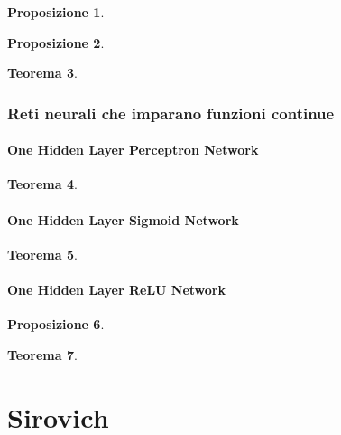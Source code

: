 \documentclass[10pt]{book}
\newcommand{\1}{\mathds{1}}
\theoremstyle{definition}%
\newtheorem{thm}{Teorema}[section]
\newtheorem{prop}[thm]{Proposizione}
\theoremstyle{plain}
\theoremstyle{remark}
\begin{document}
\begin{prop}
\lipsum[1]
\end{prop}
\begin{prop}
\lipsum[2]
\end{prop}
\begin{thm}
\lipsum[4]
\end{thm}
\section{Reti neurali che imparano funzioni continue}
\label{sec:orgf5c5714}

\subsection{One Hidden Layer Perceptron Network}
\label{sec:org2c7be58}

\begin{thm}
\lipsum[5]
\end{thm}
\subsection{One Hidden Layer Sigmoid Network}
\label{sec:org2e10325}

\begin{thm}
\lipsum[6]
\end{thm}
\subsection{One Hidden Layer ReLU Network}
\label{sec:orgeb38873}

\begin{prop}
\lipsum[7]
\end{prop}
\begin{thm}
\lipsum[8]
\end{thm}
\part{Sirovich}
\end{document}
